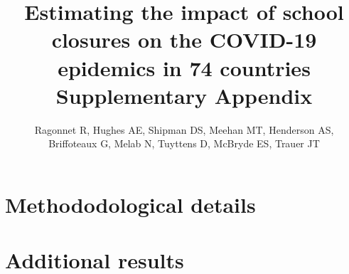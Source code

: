 \documentclass[10pt,a4paper]{report}
\author{
    Ragonnet R, Hughes AE, Shipman DS, Meehan MT, Henderson AS,\\Briffoteaux G, Melab N, Tuyttens D, McBryde ES, Trauer JT
}
\title{
    Estimating the impact of school closures on the COVID-19 epidemics in 74 countries\\
    \Large Supplementary Appendix
}
\date{\vspace{-5ex}} %
\begin{document}
\maketitle
\tableofcontents
\newpage
\chapter{Methododological details}




\newpage
\printbibliography


\chapter{Additional results}

\end{document}
